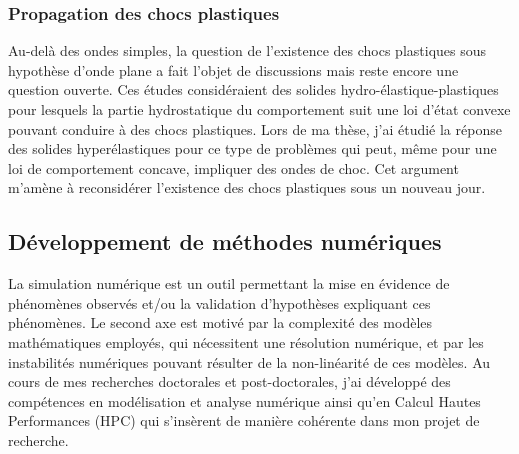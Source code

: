 
\subsubsection*{Propagation des chocs plastiques}

Au-delà des ondes simples, la question de l'existence des chocs plastiques sous hypothèse d'onde plane a fait l'objet de discussions \cite{Rice,Morland,Mandel1,Germain_shock,Claude,Mandel2,Wang} mais reste encore une question ouverte.
Ces études considéraient des solides hydro-élastique-plastiques pour lesquels la partie hydrostatique du comportement suit une loi d'état convexe pouvant conduire à des chocs plastiques.
Lors de ma thèse, j'ai étudié la réponse des solides hyperélastiques pour ce type de problèmes qui peut, même pour une loi de comportement concave, impliquer des ondes de choc.
%
Cet argument m'amène à reconsidérer l'existence des chocs plastiques sous un nouveau jour.


\subsection{Développement de méthodes numériques}
\label{sec:numerique}

La simulation numérique est un outil permettant la mise en évidence de phénomènes observés et/ou la validation d'hypothèses expliquant ces phénomènes.
%
Le second axe est motivé par la complexité des modèles mathématiques employés, qui nécessitent une résolution numérique, et par les instabilités numériques pouvant résulter de la non-linéarité de ces modèles. %
Au cours de mes recherches doctorales et post-doctorales, j'ai développé des compétences en modélisation et analyse numérique ainsi qu'en Calcul Hautes Performances (HPC) qui s'insèrent de manière cohérente dans mon projet de recherche.

